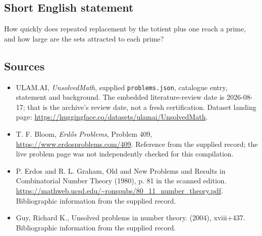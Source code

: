 \documentclass[11pt,a4paper]{article}
\begin{document}
\subsection{Short English statement}

How quickly does repeated replacement by the totient plus one reach a prime, and how large are the sets attracted to each prime?

\subsection{Sources}

{\small

\begin{itemize}

\item[\hypertarget{source:statement:1}{S1}] ULAM.AI, \emph{UnsolvedMath}, supplied \texttt{problems.json}, catalogue entry, statement and background. The embedded literature-review date is 2026-08-17; that is the archive’s review date, not a fresh certification. Dataset landing page: \url{https://huggingface.co/datasets/ulamai/UnsolvedMath}.

\item[\hypertarget{source:statement:2}{S2}] T. F. Bloom, \emph{Erdős Problems}, Problem 409, \url{https://www.erdosproblems.com/409}. Reference from the supplied record; the live problem page was not independently checked for this compilation.

\item[\hypertarget{source:statement:3}{S3}] P. Erdos and R. L. Graham, Old and New Problems and Results in Combinatorial Number Theory (1980), p. 81 in the scanned edition. \url{https://mathweb.ucsd.edu/~ronspubs/80_11_number_theory.pdf}. Bibliographic information from the supplied record.

\item[\hypertarget{source:statement:4}{S4}] Guy, Richard K., Unsolved problems in number theory. (2004), xviii+437. Bibliographic information from the supplied record.

\end{itemize}

}

\label{end:statement}
\end{document}
